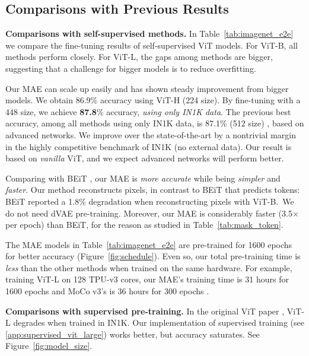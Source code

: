 \subsection{Comparisons with Previous Results}

\textbf{Comparisons with self-supervised methods.} In Table~\ref{tab:imagenet_e2e} we compare the fine-tuning results of self-supervised ViT models. For ViT-B, all methods perform closely. For \mbox{ViT-L}, the gaps among methods are bigger, suggesting that a challenge for bigger models is to reduce overfitting.

Our MAE can scale up easily and has shown steady improvement from bigger models. We obtain 86.9\% accuracy using \mbox{ViT-H} (224 size). By fine-tuning with a 448 size, we achieve \textbf{87.8}\% accuracy, \textit{using only IN1K data}. The previous best accuracy, among all methods using only IN1K data, is 87.1\% (512 size) \cite{Yuan2021}, based on advanced networks. We improve over the state-of-the-art by a nontrivial margin in the highly competitive benchmark of IN1K (no external data). Our result is based on \textit{vanilla} ViT, and we expect advanced networks will perform better.

Comparing with BEiT \cite{Bao2021}, our MAE is \textit{more accurate} while being \textit{simpler} and \textit{faster}. Our method reconstructs pixels, in contrast to BEiT that predicts tokens: BEiT reported a 1.8\% degradation \cite{Bao2021} when reconstructing pixels with \mbox{ViT-B}.\footnotemark~We do not need dVAE pre-training. Moreover, our MAE is considerably faster (3.5$\times$ per epoch) than BEiT, for the reason as studied in Table~\ref{tab:mask_token}.


The MAE models in Table~\ref{tab:imagenet_e2e} are pre-trained for 1600 epochs for better accuracy (Figure~\ref{fig:schedule}). Even so, our total pre-training time is \textit{less} than the other methods when trained on the same hardware. For example, training \mbox{ViT-L} on 128 TPU-v3 cores, our MAE's training time is 31 hours for 1600 epochs and MoCo v3's is 36 hours for 300 epochs \cite{Chen2021a}.

\textbf{Comparisons with supervised pre-training.} In the original ViT paper \cite{Dosovitskiy2021}, ViT-L degrades when trained in IN1K. Our implementation of supervised training (see \ref{app:supervised_vit_large}) works better, but accuracy saturates. See Figure~\ref{fig:model_size}. 

